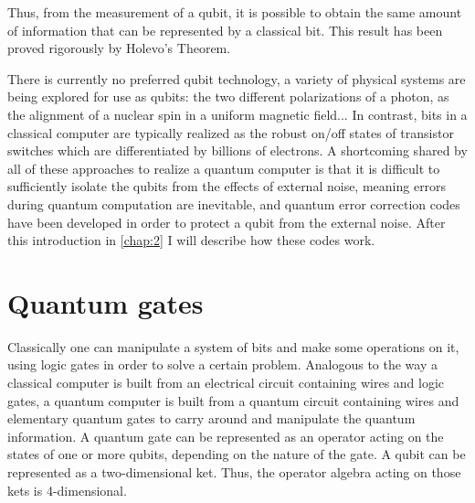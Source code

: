 Thus, from the measurement of a qubit, it is possible to obtain the same amount of information that can be represented by a classical bit. This result has been proved rigorously by Holevo's Theorem.








There is currently no preferred qubit technology, a variety of physical systems are being explored for use as qubits: the two different polarizations of a photon, as the alignment of a nuclear spin in a uniform magnetic field... 
In contrast, bits in a classical computer are typically realized as the robust on/off states of transistor switches which are differentiated by billions of electrons.
A shortcoming shared by all of these approaches to realize a quantum computer is that it is difficult to sufficiently isolate the qubits from the effects of external noise, meaning errors during quantum computation are inevitable, and quantum error correction codes have been developed in order to protect a qubit from the external noise. After this introduction in \ref{chap:2} I will describe how these codes work. 


\section{Quantum gates}\label{sec:qgate}

Classically one can manipulate a system of bits and make some operations on it, using logic gates in order to solve a certain problem. Analogous to the way a classical computer is built from an electrical circuit containing wires and logic gates, a quantum computer is built from a quantum circuit containing wires and elementary quantum gates to carry around and manipulate the quantum information.
A quantum gate can be represented as an operator acting on the states of one or more qubits, depending on the nature of the gate.
A qubit can be represented as a two-dimensional ket. Thus, the operator algebra acting on those kets is 4-dimensional. 


